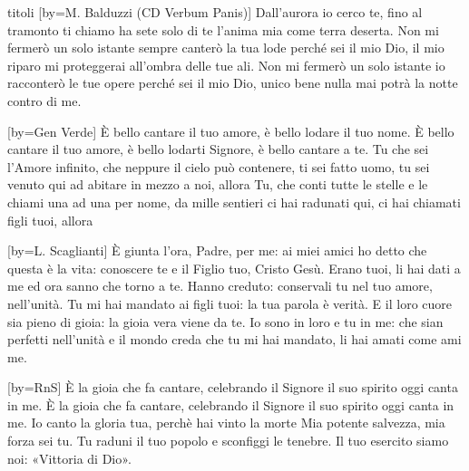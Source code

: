 \begin{songs}{titoli}
[by={M. Balduzzi (CD Verbum Panis)}]
\beginchorus
Dall'aurora io cerco te, fino al tramonto ti chiamo
ha sete solo di te l'anima mia come terra deserta.
\endchorus
\beginverse
Non mi fermerò un solo istante sempre canterò la tua lode
perché sei il mio Dio, il mio riparo
mi proteggerai all'ombra delle tue ali.
\endverse
\beginverse
Non mi fermerò un solo istante io racconterò le tue opere
perché sei il mio Dio, unico bene
nulla mai potrà la notte contro di me.
\endverse
\endsong

[by={Gen Verde}]
\beginchorus
È bello cantare il tuo amore, è bello lodare il tuo nome.
È bello cantare il tuo amore, è bello lodarti Signore,
è bello cantare a te. 
\endchorus
\beginverse
Tu che sei l'Amore infinito, che neppure il cielo può contenere,
ti sei fatto uomo, tu sei venuto qui
ad abitare in mezzo a noi, allora
\endverse
\beginverse
Tu, che conti tutte le stelle e le chiami una ad una per nome,
da mille sentieri ci hai radunati qui,
ci hai chiamati figli tuoi, allora
\endverse
\endsong

[by={L. Scaglianti}]
\beginverse
È giunta l'ora, Padre, per me: ai miei amici ho detto che
questa è la vita: conoscere te e il Figlio tuo, Cristo Gesù.
\endverse
\beginverse
Erano tuoi, li hai dati a me ed ora sanno che torno a te.
Hanno creduto: conservali tu nel tuo amore, nell'unità.
\endverse
\beginverse
Tu mi hai mandato ai figli tuoi: la tua parola è verità.
E il loro cuore sia pieno di gioia: la gioia vera viene da te.
\endverse
\beginverse
Io sono in loro e tu in me: che sian perfetti nell'unità
e il mondo creda che tu mi hai mandato, li hai amati come ami me.
\endverse
\endsong

[by={RnS}]
\beginchorus
È la gioia che fa cantare, celebrando il Signore
il suo spirito oggi canta in me.
È la gioia che fa cantare, celebrando il Signore
il suo spirito oggi canta in me.
\endchorus
\beginverse
Io canto la gloria tua, perchè hai vinto la morte
Mia potente salvezza, mia forza sei tu.
\endverse
\beginverse
Tu raduni il tuo popolo e sconfiggi le tenebre.
Il tuo esercito siamo noi: «Vittoria di Dio».
\endverse
\endsong


\end{songs}
